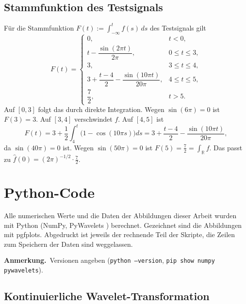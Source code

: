 \documentclass[a4paper,11pt,bibliography=totoc,listof=totoc,headinclude=true,cleardoublepage=empty,oneside]{scrbook}
\newcommand{\anmerkung}[1]{%
  \par\smallskip
  {\color{uhh_red}\small\textbf{Anmerkung.}\ #1}%
  \par\medskip}
\theoremstyle{plain}
\theoremstyle{definition}
\newcommand{\R}{\mathbb{R}}
\begin{document}
\section{Stammfunktion des Testsignals}
\label{anh:stammfunktion-testsignal}
 
Für die Stammfunktion $F(t):=\int_{-\infty}^{t}f(s)\,ds$ des Testsignals gilt
\[
  F(t)=
  \begin{cases}
    0, & t<0,\\[2pt]
    t-\dfrac{\sin(2\pi t)}{2\pi}, & 0\le t\le 3,\\[4pt]
    3, & 3\le t\le 4,\\[2pt]
    3+\dfrac{t-4}{2}-\dfrac{\sin(10\pi t)}{20\pi}, & 4\le t\le 5,\\[4pt]
    \dfrac72, & t>5.
  \end{cases}
\]
Auf $[0,3]$ folgt das durch direkte Integration. Wegen $\sin(6\pi)=0$ ist
$F(3)=3$. Auf $[3,4]$ verschwindet $f$. Auf $[4,5]$ ist
\[
  F(t)=3+\frac12\int_4^t\bigl(1-\cos(10\pi s)\bigr)ds
      =3+\frac{t-4}{2}-\frac{\sin(10\pi t)}{20\pi},
\]
da $\sin(40\pi)=0$ ist. Wegen $\sin(50\pi)=0$ ist $F(5)=\tfrac72=\int_\R f$.
Das passt zu $\hat f(0)=(2\pi)^{-1/2}\cdot\tfrac72$.

\chapter{Python-Code}
\label{chapter:anhang-code}

Alle numerischen Werte und die Daten der Abbildungen dieser Arbeit wurden mit
Python (NumPy, PyWavelets \cite{pywavelets}) berechnet. Gezeichnet sind die
Abbildungen mit pgfplots. Abgedruckt ist jeweils der rechnende Teil der
Skripte, die Zeilen zum Speichern der Daten sind weggelassen.
\anmerkung{Versionen angeben (\texttt{python --version},
\texttt{pip show numpy pywavelets}).}

\section{Kontinuierliche Wavelet-Transformation}
\label{anh:code-testsignal}
\end{document}
